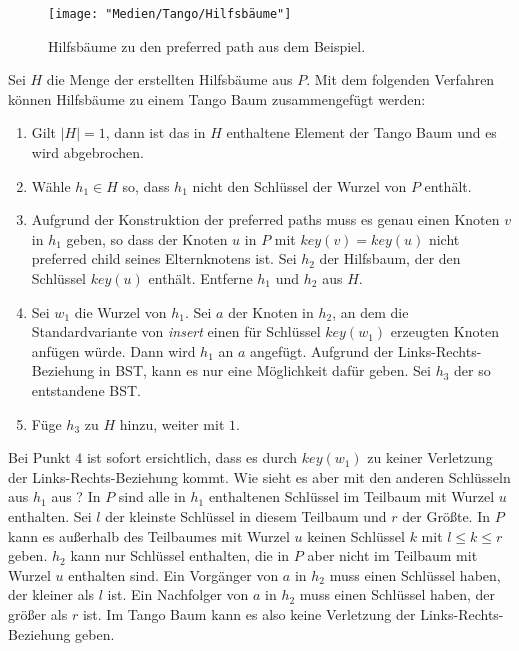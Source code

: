 \documentclass[a4paper,12pt]{article}
\begin{document}
\begin{figure}[H]
	\centering
	\texttt{[image: "Medien/Tango/Hilfsbäume"]}
	\caption{Hilfsbäume zu den preferred path aus dem Beispiel. }
	\label{fig:Hilfsbäume}
\end{figure}
\noindent Sei $H$ die Menge der erstellten Hilfsbäume aus $P$. Mit dem folgenden Verfahren können Hilfsbäume zu einem Tango Baum zusammengefügt werden:
\begin{enumerate}
	\item Gilt $\vert H \vert = 1$, dann ist das in $H$ enthaltene Element der Tango Baum und es wird abgebrochen.
	\item Wähle $h_1 \in H$ so, dass $h_1$ nicht den Schlüssel der Wurzel von $P$ enthält.
	\item Aufgrund der Konstruktion der preferred paths muss es genau einen Knoten $v$ in $h_1$ geben, so dass der Knoten $u$ in $P$ mit $\mathit{key}\left(v\right) = \mathit{key}\left(u\right) $ nicht preferred child seines Elternknotens ist.
	Sei $h_2$ der Hilfsbaum, der den Schlüssel $\mathit{key}\left(u\right)$ enthält. Entferne $h_1$ und $h_2$ aus $H$.
	\item Sei $w_1$ die Wurzel von $h_1$. Sei $a$ der Knoten in $h_2$, an dem die Standardvariante von \textit{insert} einen für Schlüssel  $\mathit{key\left(w_1\right)}$ erzeugten Knoten anfügen würde. Dann wird $h_1$ an $a$ angefügt. Aufgrund der Links-Rechts-Beziehung in BST, kann es nur eine Möglichkeit dafür geben. Sei $h_3$ der so entstandene BST.
	\item Füge $h_3$ zu $H$ hinzu, weiter mit $1$.
\end{enumerate}

\noindent Bei Punkt $4$ ist sofort ersichtlich, dass es durch $\mathit{key}\left(w_1\right)$ zu keiner Verletzung der Links-Rechts-Beziehung kommt. Wie sieht es aber mit den anderen Schlüsseln aus $h_1$ aus ? 
In $P$ sind alle in $h_1$ enthaltenen Schlüssel im Teilbaum mit Wurzel $u$ enthalten. Sei $l$ der kleinste Schlüssel in diesem Teilbaum und $r$ der Größte. In $P$ kann es außerhalb des Teilbaumes mit Wurzel $u$ keinen Schlüssel $k$ mit $l \leq k \leq r$ geben. $h_2$ kann nur Schlüssel enthalten, die in $P$ aber nicht im Teilbaum mit Wurzel $u$ enthalten sind. Ein Vorgänger von $a$ in $h_2$ muss einen Schlüssel haben, der kleiner als $l$ ist. Ein Nachfolger von $a$ in $h_2$ muss einen Schlüssel haben, der größer als $r$ ist. Im Tango Baum kann es also keine Verletzung der Links-Rechts-Beziehung geben.\\
\end{document}
